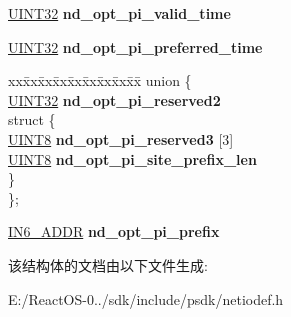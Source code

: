 \begin{DoxyCompactItemize}
\begin{tabbing}
\end{tabbing}\item 
\mbox{\label{structnd__opt__prefix__info_a2b4cde46e5e4849629cc777503cf710e}} 
\hyperlink{_processor_bind_8h_ae1e6edbbc26d6fbc71a90190d0266018}{U\+I\+N\+T32} {\bfseries nd\+\_\+opt\+\_\+pi\+\_\+valid\+\_\+time}
\item 
\mbox{\label{structnd__opt__prefix__info_a7b4708ddfe0e37bf2ed5344a44be03f1}} 
\hyperlink{_processor_bind_8h_ae1e6edbbc26d6fbc71a90190d0266018}{U\+I\+N\+T32} {\bfseries nd\+\_\+opt\+\_\+pi\+\_\+preferred\+\_\+time}
\item 
\mbox{\label{structnd__opt__prefix__info_aee776a66c5ec351acf09084abdd7ffb8}} 
\begin{tabbing}
xx\=xx\=xx\=xx\=xx\=xx\=xx\=xx\=xx\=\kill
union \{\\
\>\hyperlink{_processor_bind_8h_ae1e6edbbc26d6fbc71a90190d0266018}{UINT32} {\bfseries nd\_opt\_pi\_reserved2}\\
\mbox{\label{unionnd__opt__prefix__info_1_1_0D2671_a53388b27d8f633657c0d14ad0c89a924}} 
\>struct \{\\
\>\>\hyperlink{_processor_bind_8h_ab27e9918b538ce9d8ca692479b375b6a}{UINT8} {\bfseries nd\_opt\_pi\_reserved3} \mbox{[}3\mbox{]}\\
\>\>\hyperlink{_processor_bind_8h_ab27e9918b538ce9d8ca692479b375b6a}{UINT8} {\bfseries nd\_opt\_pi\_site\_prefix\_len}\\
\>\} \\
\}; \\

\end{tabbing}\item 
\mbox{\label{structnd__opt__prefix__info_ad7afee28552135bac22bb757e96bf3a0}} 
\hyperlink{structin6__addr}{I\+N6\+\_\+\+A\+D\+DR} {\bfseries nd\+\_\+opt\+\_\+pi\+\_\+prefix}
\end{DoxyCompactItemize}


该结构体的文档由以下文件生成\+:\begin{DoxyCompactItemize}
\item 
E\+:/\+React\+O\+S-\/0../sdk/include/psdk/netiodef.\+h\end{DoxyCompactItemize}
